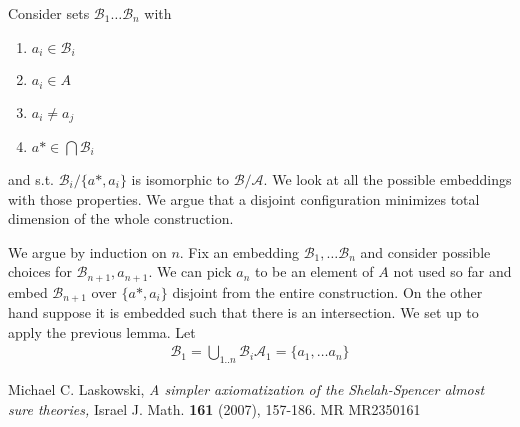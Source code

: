 \documentclass{amsart}
\newcommand{\A}{\mathcal A}
\newcommand{\B}{\mathcal B}
\begin{document}
Consider sets $\B_1 \ldots \B_n$ with 
\begin{enumerate}
	\item $a_i \in \B_i$
	\item $a_i \in A$
	\item $a_i \neq a_j$
	\item $a* \in \bigcap \B_i$
\end{enumerate}
 and  s.t. $\B_i / \{a*, a_i\}$ is isomorphic to $\B/\A$. We look at all the possible embeddings with those properties. We argue that a disjoint configuration minimizes total dimension of the whole construction.

We argue by induction on $n$. Fix an embedding $\B_1, \ldots \B_n$ and consider possible choices for $\B_{n+1}, a_{n+1}$. We can pick $a_n$ to be an element of $A$ not used so far and embed $\B_{n+1}$ over $\{a*, a_i\}$ disjoint from the entire construction. On the other hand suppose it is embedded such that there is an intersection. We set up to apply the previous lemma. Let
\begin{align*}
	\B_1 = \bigcup_{1..n} \B_i
	\A_1 = \{a_1, \ldots a_n\}
\end{align*}

\begin{thebibliography}{9}

	Michael C. Laskowski, \textsl{A simpler axiomatization of the Shelah-Spencer almost sure theories,}
	Israel J. Math. \textbf{161} (2007), 157-186. MR MR2350161

\end{thebibliography}
\end{document}
